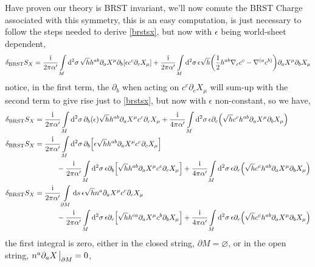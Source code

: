 Have proven our theory is BRST invariant, we'll now comute the BRST Charge associated with this symmetry, this is an easy computation, is just necessary to follow the 
steps needed to derive \ref{brstsx}, but now with $\epsilon$ being world-sheet dependent,
\begin{align*}
    \delta_{\textnormal{BRST}}S_X&=\frac{\textnormal{i}}{2\pi\alpha'}\int\limits_{M}\dd[2]{\sigma}\sqrt{h}h^{ab}\partial_aX^\mu\partial_b \qty[\epsilon c^c\partial_cX_\mu]+\frac{\textnormal{i}}{2\pi\alpha'}\int\limits_{M}\dd[2]{\sigma}\epsilon\sqrt{h}\qty(\frac12h^{ab}\nabla_cc^c-\nabla^{(a} c^{b)})\partial_aX^\mu\partial_b X_\mu\\
\end{align*}
notice, in the first term, the $\partial_b$ when acting on $c^c\partial_c X_\mu$ will sum-up with the second term to give rise just to \ref{brstsx}, but now with $\epsilon$ non-constant, so we have,
\begin{align*}
    \delta_{\textnormal{BRST}}S_X&=\frac{\textnormal{i}}{2\pi\alpha'}\int\limits_{M}\dd[2]{\sigma}\partial_b \qty(\epsilon)\sqrt{h}h^{ab}\partial_aX^\mu c^c\partial_cX_\mu+\frac{\textnormal{i}}{4\pi\alpha'}\int\limits_{M}\dd[2]{\sigma}\epsilon\partial_c\qty(\sqrt{h}c^c h^{ab}\partial_aX^\mu \partial_bX_\mu)\\
    \delta_{\textnormal{BRST}}S_X&=\frac{\textnormal{i}}{2\pi\alpha'}\int\limits_{M}\dd[2]{\sigma}\partial_b \qty[\epsilon\sqrt{h}h^{ab}\partial_aX^\mu c^c\partial_cX_\mu]\\
    &\quad\quad\quad-\frac{\textnormal{i}}{2\pi\alpha'}\int\limits_{M}\dd[2]{\sigma}\epsilon\partial_b \qty[\sqrt{h}h^{ab}\partial_aX^\mu c^c\partial_cX_\mu]+\frac{\textnormal{i}}{4\pi\alpha'}\int\limits_{M}\dd[2]{\sigma}\epsilon\partial_c\qty(\sqrt{h}c^c h^{ab}\partial_aX^\mu \partial_bX_\mu)\\
    \delta_{\textnormal{BRST}}S_X&=\frac{\textnormal{i}}{2\pi\alpha'}\int\limits_{\partial M}\dd{s} \epsilon\sqrt{h}n^a\partial_aX^\mu c^c\partial_cX_\mu\\
    &\quad\quad\quad-\frac{\textnormal{i}}{2\pi\alpha'}\int\limits_{M}\dd[2]{\sigma}\epsilon\partial_c \qty[\sqrt{h}h^{ca}\partial_aX^\mu c^b\partial_bX_\mu]+\frac{\textnormal{i}}{4\pi\alpha'}\int\limits_{M}\dd[2]{\sigma}\epsilon\partial_c\qty(\sqrt{h}c^c h^{ab}\partial_aX^\mu \partial_bX_\mu)
\end{align*}
the first integral is zero, either in the closed string, $\partial M=\varnothing$, or in the open string, $n^a\partial_a X\eval_{\partial M}=0$,
